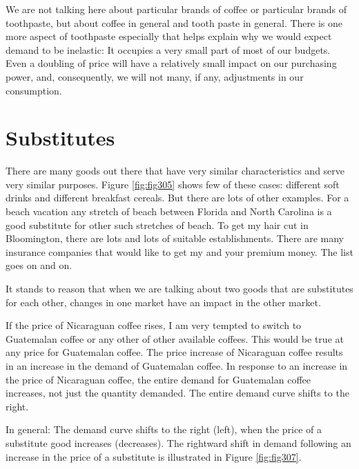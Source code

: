 \documentclass[
]{book}
\begin{document}
We are not talking here about particular brands of coffee or particular brands of toothpaste, but about coffee in general and tooth paste in general. There is one more aspect of toothpaste especially that helps explain why we would expect demand to be inelastic: It occupies a very small part of most of our budgets. Even a doubling of price will have a relatively small impact on our purchasing power, and, consequently, we will not many, if any, adjustments in our consumption.

\hypertarget{substitutes}{%
\section{Substitutes}\label{substitutes}}

There are many goods out there that have very similar characteristics and serve very similar purposes. Figure \ref{fig:fig305} shows few of these cases: different soft drinks and different breakfast cereals. But there are lots of other examples. For a beach vacation any stretch of beach between Florida and North Carolina is a good substitute for other such stretches of beach. To get my hair cut in Bloomington, there are lots and lots of suitable establishments. There are many insurance companies that would like to get my and your premium money. The list goes on and on.

It stands to reason that when we are talking about two goods that are substitutes for each other, changes in one market have an impact in the other market.

If the price of Nicaraguan coffee rises, I am very tempted to switch to Guatemalan coffee or any other of other available coffees. This would be true at any price for Guatemalan coffee. The price increase of Nicaraguan coffee results in an increase in the demand of Guatemalan coffee. In response to an increase in the price of Nicaraguan coffee, the entire demand for Guatemalan coffee increases, not just the quantity demanded. The entire demand curve shifts to the right.

In general: The demand curve shifts to the right (left), when the price of a substitute good increases (decreases). The rightward shift in demand following an increase in the price of a substitute is illustrated in Figure \ref{fig:fig307}.
\end{document}
